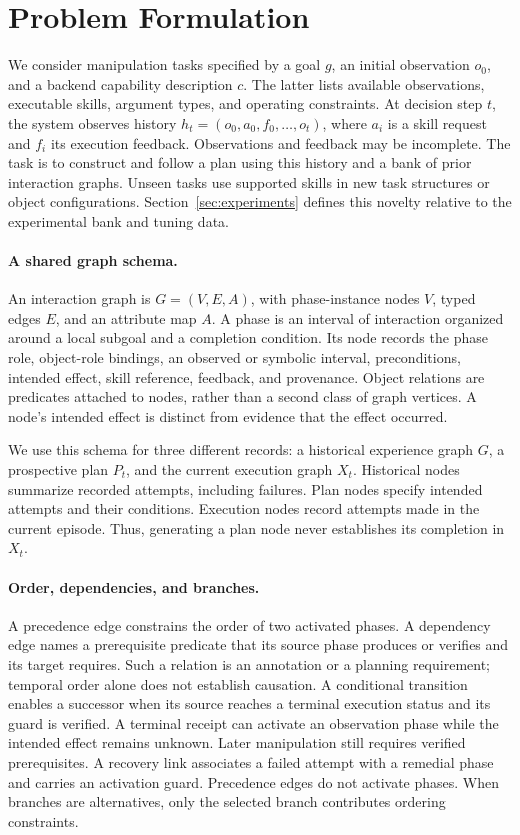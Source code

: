 \section{Problem Formulation}
\label{sec:formulation}

We consider manipulation tasks specified by a goal $g$, an initial observation $o_0$, and a backend capability description $c$. The latter lists available observations, executable skills, argument types, and operating constraints. At decision step $t$, the system observes history $h_t=(o_0,a_0,f_0,\ldots,o_t)$, where $a_i$ is a skill request and $f_i$ its execution feedback. Observations and feedback may be incomplete. The task is to construct and follow a plan using this history and a bank of prior interaction graphs. Unseen tasks use supported skills in new task structures or object configurations. Section~\ref{sec:experiments} defines this novelty relative to the experimental bank and tuning data.

\paragraph{A shared graph schema.}
An interaction graph is $G=(V,E,A)$, with phase-instance nodes $V$, typed edges $E$, and an attribute map $A$. A phase is an interval of interaction organized around a local subgoal and a completion condition. Its node records the phase role, object-role bindings, an observed or symbolic interval, preconditions, intended effect, skill reference, feedback, and provenance. Object relations are predicates attached to nodes, rather than a second class of graph vertices. A node's intended effect is distinct from evidence that the effect occurred.

We use this schema for three different records: a historical experience graph $G$, a prospective plan $P_t$, and the current execution graph $X_t$. Historical nodes summarize recorded attempts, including failures. Plan nodes specify intended attempts and their conditions. Execution nodes record attempts made in the current episode. Thus, generating a plan node never establishes its completion in $X_t$.

\paragraph{Order, dependencies, and branches.}
A precedence edge constrains the order of two activated phases. A dependency edge names a prerequisite predicate that its source phase produces or verifies and its target requires. Such a relation is an annotation or a planning requirement; temporal order alone does not establish causation. A conditional transition enables a successor when its source reaches a terminal execution status and its guard is verified. A terminal receipt can activate an observation phase while the intended effect remains unknown. Later manipulation still requires verified prerequisites. A recovery link associates a failed attempt with a remedial phase and carries an activation guard. Precedence edges do not activate phases. When branches are alternatives, only the selected branch contributes ordering constraints.

